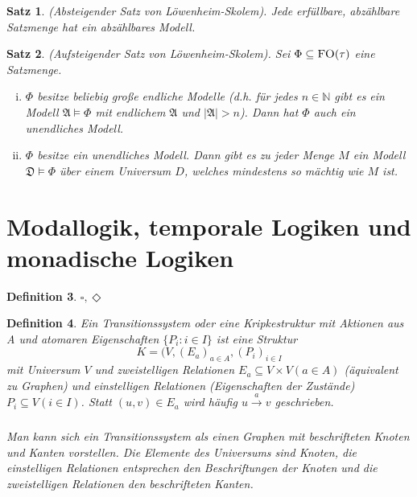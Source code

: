 \documentclass[12pt,a4paper]{article}
\newtheorem{defi}{Definition}[section]
\newtheorem{satz}[defi]{Satz}
\begin{document}
	\begin{satz}
		(Absteigender Satz von Löwenheim-Skolem). Jede erfüllbare, abzählbare Satzmenge hat ein abzählbares Modell.
	\end{satz}
	\begin{satz}
		(Aufsteigender Satz von Löwenheim-Skolem). Sei $\Phi\subseteq\textsc{FO}(\tau)$ eine Satzmenge.
		\begin{enumerate}[(i)]
			\item $\Phi$ besitze beliebig große endliche Modelle (d.h. für jedes $n\in\mathbb{N}$ gibt es ein Modell $\mathfrak{A}\models\Phi$ mit endlichem $\mathfrak{A}$ und $|\mathfrak{A}|>n$). Dann hat $\Phi$ auch ein unendliches Modell.
			\item $\Phi$ besitze ein unendliches Modell. Dann gibt es zu jeder Menge $M$ ein Modell $\mathfrak{D}\models\Phi$ über einem Universum $D$, welches mindestens so mächtig wie $M$ ist.
		\end{enumerate}
	\end{satz}
\section{Modallogik, temporale Logiken und monadische Logiken}
	\begin{defi}
		$\square, \Diamond$
	\end{defi}
	
	\begin{defi}
		Ein Transitionssystem oder eine Kripkestruktur mit Aktionen aus A und atomaren Eigenschaften $\{P_i:i \in I \}$ ist eine Struktur
		$$K = (V,(E_a)_{a\in A}, (P_i)_{i \in I}$$
		mit Universum $V$ und zweistelligen Relationen $E_a \subseteq V \times V (a\in A)$ (äquivalent zu Graphen) und einstelligen Relationen (Eigenschaften der Zustände) $P_i \subseteq V (i \in I)$. Statt $(u,v) \in E_a$ wird häufig $u \xrightarrow[]{a} v$ geschrieben.\\
		\\
		Man kann sich ein Transitionssystem als einen Graphen mit beschrifteten
Knoten und Kanten vorstellen. Die Elemente des Universums
sind Knoten, die einstelligen Relationen entsprechen den Beschriftungen
der Knoten und die zweistelligen Relationen den beschrifteten
Kanten.
	\end{defi}
	
\end{document}
